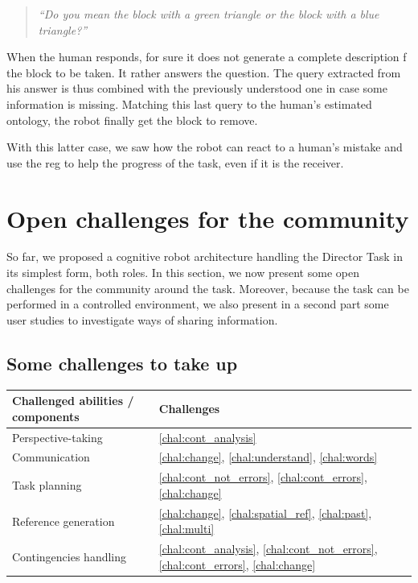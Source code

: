 \documentclass[a4paper,11pt,twoside]{StyleThese}
\begin{document}
\begin{quote} 
	\centering 
	\textit{``Do you mean the block with a green triangle or the block with a blue triangle?''}
\end{quote}

When the human responds, for sure it does not generate a complete description f the block to be taken. It rather answers the question. The query extracted from his answer is thus combined with the previously understood one in case some information is missing. Matching this last query to the human's estimated ontology, the robot finally get the block to remove.

With this latter case, we saw how the robot can react to a human's mistake and use the \acrshort{reg} to help the progress of the task, even if it is the receiver.

\section{Open challenges for the community }
\label{sec:challenges}

So far, we proposed a cognitive robot architecture handling the Director Task in its simplest form, both 
roles. In this section, we now present some open challenges for the community around the task. Moreover, because the task can be performed in a controlled environment, we also present in a second part some user studies to investigate ways of sharing information.

\subsection{Some challenges to take up}

\begin{center}
	\begin{tabular}{||l | l ||} 
		\hline
		Challenged abilities / components & Challenges \\ [0.5ex]
		\hline\hline
		Perspective-taking & \ref{chal:cont_analysis}  \\ 
		\hline
		Communication & \ref{chal:change}, \ref{chal:understand}, \ref{chal:words}\\
		\hline
		Task planning & \ref{chal:cont_not_errors}, \ref{chal:cont_errors},  \ref{chal:change} \\
		\hline
		Reference generation & \ref{chal:change}, \ref{chal:spatial_ref}, \ref{chal:past}, \ref{chal:multi} \\
		\hline
		Contingencies handling & \ref{chal:cont_analysis}, \ref{chal:cont_not_errors}, \ref{chal:cont_errors}, \ref{chal:change} \\ [1ex]
		\hline
	\end{tabular}
\end{center}
\end{document}
